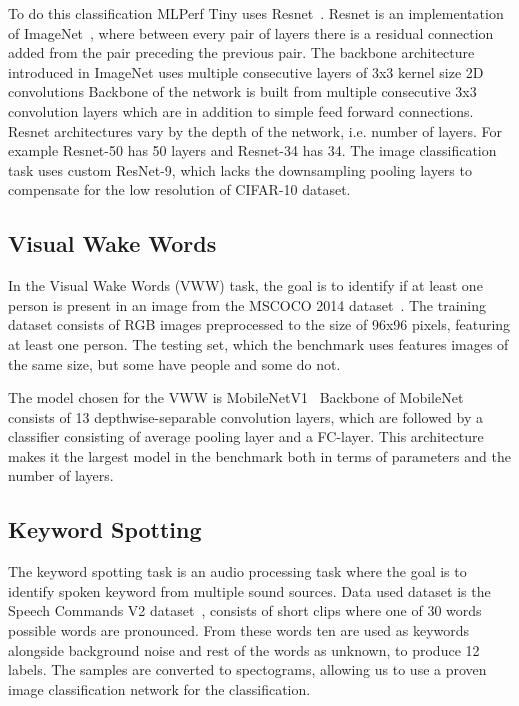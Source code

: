 \documentclass[12pt,a4paper,english
]{tunithesis}
\begin{document}
To do this classification MLPerf Tiny uses Resnet~\cite{he2015deepresiduallearningimage}. Resnet is an implementation of ImageNet~\cite{krizhevsky_imagenet_2012}, where between every pair of layers there is a residual connection added from the pair preceding the previous pair.
The backbone architecture introduced in ImageNet uses multiple consecutive layers of 3x3 kernel size 2D convolutions
Backbone of the network is built from multiple consecutive 3x3 convolution layers which are in addition to simple feed forward connections.
Resnet architectures vary by the depth of the network, i.e. number of layers. For example Resnet-50 has 50 layers and Resnet-34 has 34. The image classification task uses custom ResNet-9, which lacks the downsampling pooling layers to compensate for the low resolution of CIFAR-10 dataset.

\subsection{Visual Wake Words}
In the Visual Wake Words (VWW) task, the goal is to identify if at least one person is present in an image from the MSCOCO 2014 dataset~\cite{lin_microsoft_2015}.
The training dataset consists of RGB images preprocessed to the size of 96x96 pixels, featuring at least one person. The testing set, which the benchmark uses features images of the same size, but some have people and some do not.

The model chosen for the VWW is MobileNetV1~\cite{howard2017mobilenetsefficientconvolutionalneural}
Backbone of MobileNet consists of 13 depthwise-separable convolution layers, which are followed by a classifier consisting of average pooling layer and a FC-layer. This architecture makes it the largest model in the benchmark both in terms of parameters and the number of layers.

\subsection{Keyword Spotting}
The keyword spotting task is an audio processing task where the goal is to identify spoken keyword from multiple sound sources. Data used dataset is the Speech Commands V2 dataset~\cite{warden_speech_2018}, consists of short clips where one of 30 words possible words are pronounced. From these words ten are used as keywords alongside background noise and rest of the words as unknown, to produce 12 labels. The samples are converted to spectograms, allowing us to use a proven image classification network for the classification.
\end{document}
